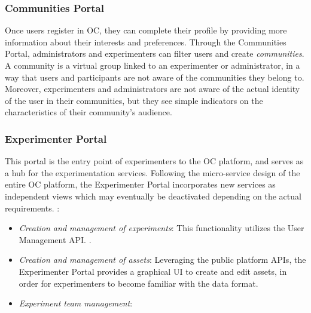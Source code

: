 \subsubsection{Communities Portal}
 
Once users register in OC, they can complete their profile by providing more information about their interests and preferences. Through the Communities Portal, administrators and experimenters can filter users and create \emph{communities}. A community is a virtual group linked to an experimenter or administrator, in a way that users and participants are not aware of the communities they belong to. %
Moreover, experimenters and administrators are not aware of the actual identity of the user in their communities, but they see simple indicators on the characteristics of their community's audience.

\subsubsection{Experimenter Portal}

This portal is the entry point of experimenters to the OC platform, and serves as a hub for the experimentation services. Following the micro-service design of the entire OC platform, the Experimenter Portal incorporates new services as independent views which may eventually be deactivated depending on the actual requirements. :

\begin{itemize}
	\item \emph{Creation and management of experiments}: This functionality utilizes the User Management API. . 
	\item \emph{Creation and management of assets}: Leveraging the public platform APIs, the Experimenter Portal provides a graphical UI to create and edit assets, in order for experimenters to become familiar with the data format. 
	\item \emph{Experiment team management}: 
\end{itemize}	

